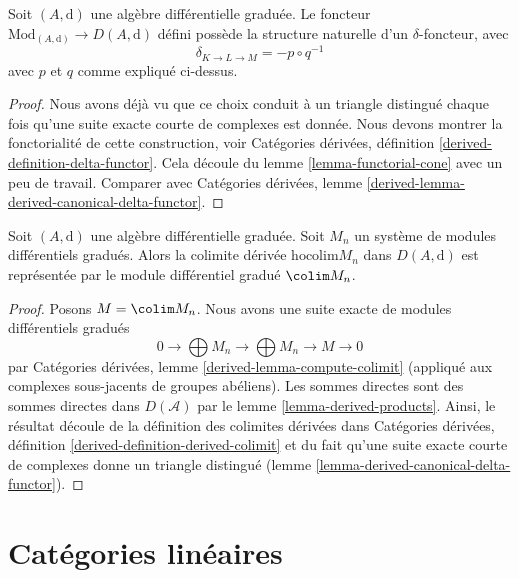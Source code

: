 \begin{lemma}
\label{lemma-derived-canonical-delta-functor}
Soit $(A, \text{d})$ une algèbre différentielle graduée. Le foncteur
$\text{Mod}_{(A, \text{d})} \to D(A, \text{d})$
défini possède la structure naturelle d'un $\delta$-foncteur, avec
$$
\delta_{K \to L \to M} = - p \circ q^{-1}
$$
avec $p$ et $q$ comme expliqué ci-dessus.
\end{lemma}

\begin{proof}
Nous avons déjà vu que ce choix conduit à un triangle distingué
chaque fois qu'une suite exacte courte de complexes est donnée.
Nous devons montrer la fonctorialité de cette construction,
voir Catégories dérivées, définition \ref{derived-definition-delta-functor}.
Cela découle du lemme \ref{lemma-functorial-cone} avec un peu de
travail. Comparer avec
Catégories dérivées, lemme \ref{derived-lemma-derived-canonical-delta-functor}.
\end{proof}

\begin{lemma}
\label{lemma-homotopy-colimit}
Soit $(A, \text{d})$ une algèbre différentielle graduée.
Soit $M_n$ un système de modules différentiels gradués. Alors la colimite
dérivée $\text{hocolim} M_n$ dans $D(A, \text{d})$ est représentée
par le module différentiel gradué $\colim M_n$.
\end{lemma}

\begin{proof}
Posons $M = \colim M_n$. Nous avons une suite exacte de modules différentiels gradués
$$
0 \to \bigoplus M_n \to \bigoplus M_n \to M \to 0
$$
par Catégories dérivées, lemme \ref{derived-lemma-compute-colimit}
(appliqué aux complexes sous-jacents de groupes abéliens).
Les sommes directes sont des sommes directes dans
$D(\mathcal{A})$ par le lemme
\ref{lemma-derived-products}. Ainsi, le résultat découle de la
définition des colimites dérivées dans
Catégories dérivées, définition
\ref{derived-definition-derived-colimit} et du fait qu'une suite exacte courte de
complexes donne un triangle distingué
(lemme \ref{lemma-derived-canonical-delta-functor}).
\end{proof}








\section{Catégories linéaires}
\label{section-linear}

